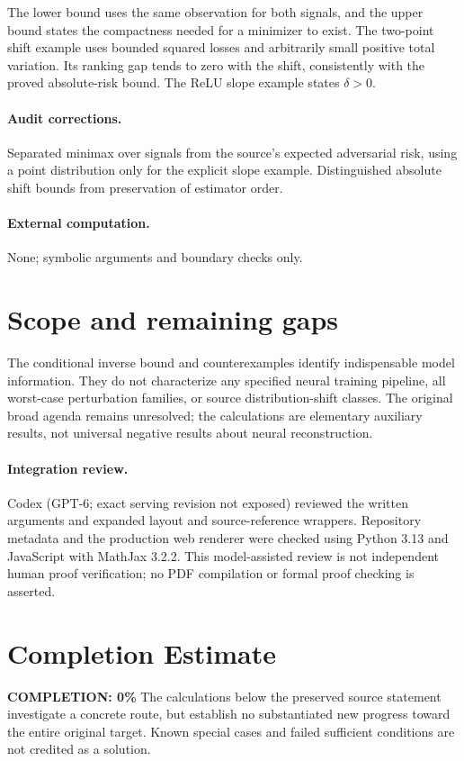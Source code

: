 \documentclass[11pt]{article}
\begin{document}
The lower bound uses the same observation for both signals, and the upper bound
states the compactness needed for a minimizer to exist. The two-point shift
example uses bounded squared losses and arbitrarily small positive total
variation. Its ranking gap tends to zero with the shift, consistently with the
proved absolute-risk bound. The ReLU slope example states $\delta>0$.

\paragraph{Audit corrections.} Separated minimax over signals from the source's expected adversarial
risk, using a point distribution only for the explicit slope example. Distinguished
absolute shift bounds from preservation of estimator order.
\paragraph{External computation.} None; symbolic arguments and boundary checks only.
\section{Scope and remaining gaps}

The conditional inverse bound and counterexamples identify indispensable model
information. They do not characterize any specified neural training pipeline,
all worst-case perturbation families, or source distribution-shift classes.
The original broad agenda remains unresolved; the calculations are elementary
auxiliary results, not universal negative results about neural reconstruction.

\paragraph{Integration review.} Codex (GPT-6; exact serving revision not exposed) reviewed the written arguments and expanded layout and source-reference wrappers. Repository metadata and the production web renderer were checked using Python 3.13 and JavaScript with MathJax 3.2.2. This model-assisted review is not independent human proof verification; no PDF compilation or formal proof checking is asserted.

\section{Completion Estimate}
\noindent\textbf{COMPLETION: 0\%}
The calculations below the preserved source statement investigate a concrete route,
but establish no substantiated new progress toward the entire original target.
Known special cases and failed sufficient conditions are not credited as a solution.
\end{document}
